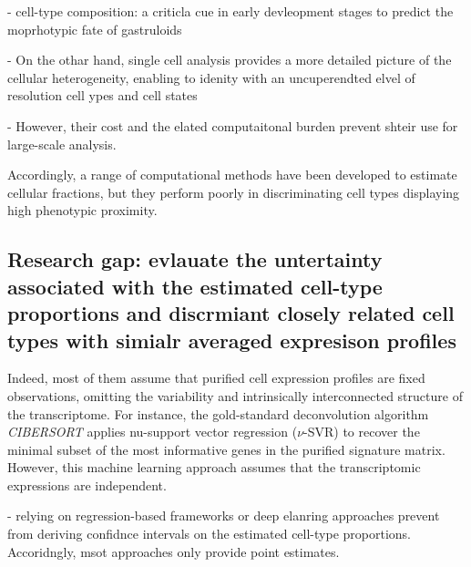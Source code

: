 \documentclass[pdflatex, sn-nature]{sn-jnl}
\theoremstyle{thmstyleone}%
\theoremstyle{thmstyletwo}%
\theoremstyle{thmstylethree}%
\begin{document}
   - cell-type composition: a criticla cue in early devleopment stages to predict the moprhotypic fate of gastruloids

   - On the othar hand, single cell analysis provides a more detailed picture of the cellular heterogeneity,
   enabling to idenity with an uncuperendted elvel of resolution cell ypes and cell states 

   - However, their cost and the elated computaitonal burden prevent shteir use for large-scale analysis.


    Accordingly, a range of computational methods have been developed to
    estimate cellular fractions, but they perform poorly in discriminating cell types
    displaying high phenotypic proximity. 
    
    \subsection{Research gap: evlauate the untertainty associated with the estimated cell-type proportions and
     discrmiant closely related cell types with simialr averaged expresison profiles}
    
    Indeed, most of them assume that purified
    cell expression profiles are fixed observations, omitting the variability
    and intrinsically interconnected structure of the transcriptome. For instance,
    the gold-standard deconvolution algorithm \emph{CIBERSORT} \cite{newmanRobustEnumerationCell2015}
    applies nu-support vector regression ($\nu$-SVR) to recover the minimal subset
    of the most informative genes in the purified signature matrix. However, this
    machine learning approach assumes that the transcriptomic expressions are independent. 

    - relying on regression-based frameworks or deep elanring approaches prevent from 
    deriving confidnce intervals on the estimated cell-type proportions. Accoridngly, msot approaches only provide point estimates.

    

\end{document}

